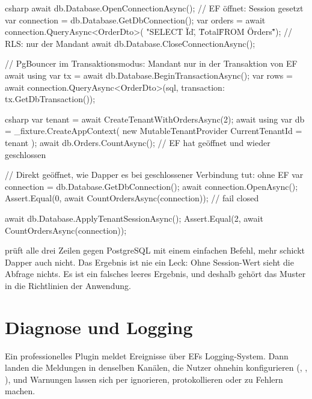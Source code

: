 \begin{sourcecode}{csharp}
await db.Database.OpenConnectionAsync();                // EF öffnet: Session gesetzt
var connection = db.Database.GetDbConnection();
var orders = await connection.QueryAsync<OrderDto>(
    "SELECT \"Id\", \"Total\" FROM \"Orders\"");             // RLS: nur der Mandant
await db.Database.CloseConnectionAsync();

// PgBouncer im Transaktionsmodus: Mandant nur in der Transaktion von EF
await using var tx = await db.Database.BeginTransactionAsync();
var rows = await connection.QueryAsync<OrderDto>(sql, transaction: tx.GetDbTransaction());
\end{sourcecode}

\begin{sourcecode}{csharp}
var tenant = await CreateTenantWithOrdersAsync(2);
await using var db = _fixture.CreateAppContext(
    new MutableTenantProvider { CurrentTenantId = tenant });
await db.Orders.CountAsync();                 // EF hat geöffnet und wieder geschlossen

// Direkt geöffnet, wie Dapper es bei geschlossener Verbindung tut: ohne EF
var connection = db.Database.GetDbConnection();
await connection.OpenAsync();
Assert.Equal(0, await CountOrdersAsync(connection));      // fail closed

await db.Database.ApplyTenantSessionAsync();
Assert.Equal(2, await CountOrdersAsync(connection));
\end{sourcecode}

 prüft alle drei Zeilen gegen
PostgreSQL mit einem einfachen Befehl, mehr schickt Dapper auch nicht. Das Ergebnis ist nie ein
Leck: Ohne Session-Wert sieht die Abfrage nichts. Es ist ein falsches leeres Ergebnis, und
deshalb gehört das Muster in die Richtlinien der Anwendung.

\chapter{Diagnose und Logging}\label{ch:diagnostics-and-logging}

Ein professionelles Plugin meldet Ereignisse über EFs Logging-System. Dann landen die
Meldungen in denselben Kanälen, die Nutzer ohnehin konfigurieren (,
, ), und Warnungen lassen sich
per  ignorieren, protokollieren oder zu Fehlern machen.

